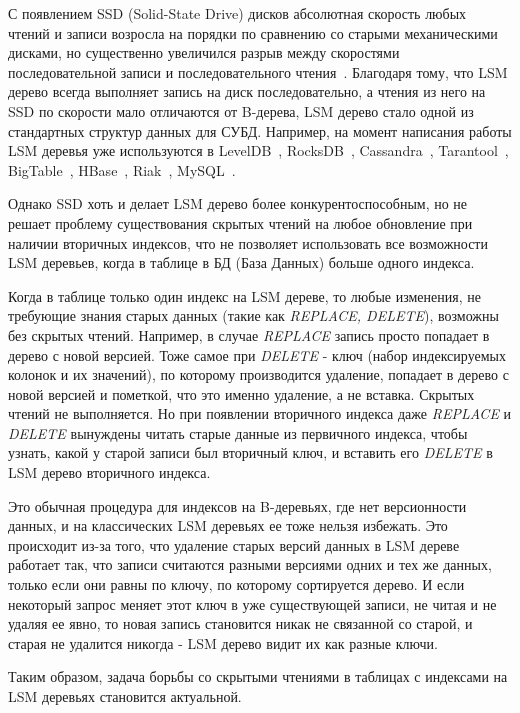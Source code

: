 \documentclass[a4paper,hidelinks,12pt]{article}
\begin{document}
С появлением SSD (Solid-State Drive) дисков абсолютная скорость любых чтений и
записи возросла на порядки по сравнению со старыми механическими дисками, но
существенно увеличился разрыв между скоростями последовательной записи и
последовательного чтения~\cite{ssd-tradeoff}. Благодаря тому, что LSM дерево
всегда выполняет запись на диск последовательно, а чтения из него на SSD по
скорости мало отличаются от B-дерева, LSM дерево стало одной из стандартных
структур данных для СУБД. Например, на момент написания работы LSM деревья уже
используются в LevelDB~\cite{leveldb}, RocksDB~\cite{rocksdb},
Cassandra~\cite{open-chan-ssd}, Tarantool~\cite{tarantool},
BigTable~\cite{open-chan-ssd}, HBase~\cite{open-chan-ssd}, Riak~\cite{riak},
MySQL~\cite{myrocks}.

Однако SSD хоть и делает LSM дерево более конкурентоспособным, но не решает
проблему существования скрытых чтений на любое обновление при наличии вторичных
индексов, что не позволяет использовать все возможности LSM деревьев, когда
в таблице в БД (База Данных) больше одного индекса.

Когда в таблице только один индекс на LSM дереве, то любые изменения, не
требующие знания старых данных (такие как \textit{REPLACE, DELETE}), возможны
без скрытых чтений. Например, в случае \textit{REPLACE} запись просто попадает
в дерево с новой версией. Тоже самое при \textit{DELETE} - ключ (набор
индексируемых колонок и их значений), по которому производится удаление,
попадает в дерево с новой версией и пометкой, что это именно удаление, а не
вставка. Скрытых чтений не выполняется. Но при появлении вторичного индекса даже
\textit{REPLACE} и \textit{DELETE} вынуждены читать старые данные из первичного
индекса, чтобы узнать, какой у старой записи был вторичный ключ, и вставить его
\textit{DELETE} в LSM дерево вторичного индекса.

Это обычная процедура для индексов на B-деревьях, где нет версионности данных, и
на классических LSM деревьях ее тоже нельзя избежать. Это происходит из-за того,
что удаление старых версий данных в LSM дереве работает так, что записи
считаются разными версиями одних и тех же данных, только если они равны по
ключу, по которому сортируется дерево. И если некоторый запрос меняет этот ключ
в уже существующей записи, не читая и не удаляя ее явно, то новая запись
становится никак не связанной со старой, и старая не удалится никогда - LSM
дерево видит их как разные ключи.

Таким образом, задача борьбы со скрытыми чтениями в таблицах с индексами на LSM
деревьях становится актуальной.
\end{document}
